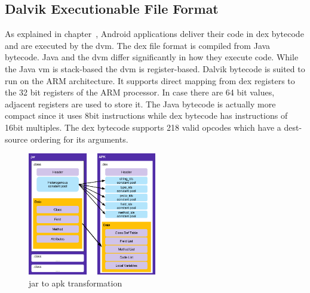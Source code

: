 \subsection{Dalvik Executionable File Format} \label{subsection:android-dex}
As explained in chapter~\cite{subsection:foundation-android-package}, Android applications deliver their code in \gls{dex} bytecode and are executed by the \gls{dvm}.
The dex file format is compiled from Java bytecode.
Java and the \gls{dvm} differ significantly in how they execute code.
While the Java \gls{vm} is stack-based the \gls{dvm} is register-based.
Dalvik bytecode is suited to run on the ARM architecture.
It supports direct mapping from dex registers to the 32 bit registers of the ARM processor.
In case there are 64 bit values, adjacent registers are used to store it.
The Java bytecode is actually more compact since it uses 8bit instructions while \gls{dex} bytecode has instructions of 16bit multiples.
The \gls{dex} bytecode supports 218 valid opcodes which have a dest-source ordering for its arguments. \cite{androidDalvik}
\newline
\begin{figure}[h]
    \centering
    \includegraphics[width=0.5\textwidth]{data/java.png}
    \caption{\gls{jar} to \gls{apk} transformation \cite{googleDalvik}}
    \label{fig:java}
\end{figure}

